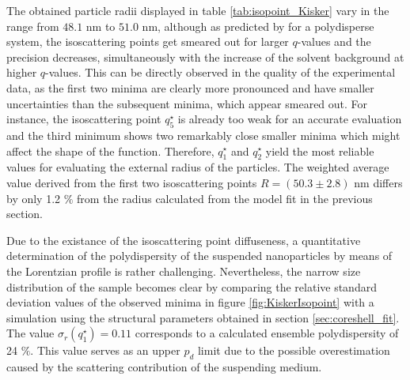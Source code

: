 The obtained particle radii displayed in table \ref{tab:isopoint_Kisker} vary in the range from \(48.1\) nm to \(51.0\) nm, although as predicted by \cite{kawaguchi_isoscattering_1992} for a polydisperse system, the isoscattering points get smeared out for larger \( q \)-values and the precision decreases, simultaneously with the increase of the solvent background at higher \(q\)-values. This can be directly observed in the quality of the experimental data, as the first two minima are clearly more pronounced and have smaller uncertainties than the subsequent minima, which appear smeared out. For instance, the isoscattering point \(q^{\star}_5\) is already too weak for an accurate evaluation and the third minimum shows two remarkably close smaller minima which might affect the shape of the function. Therefore, \(q^{\star}_1\) and \(q^{\star}_2\) yield the most reliable values for evaluating the external radius of the particles. The weighted average value derived from the first two isoscattering points \(R=\left(50.3\pm2.8 \right)\) nm differs by only 1.2 $\%$ from the radius calculated from the model fit in the previous section.
 
Due to the existance of the isoscattering point diffuseness, a quantitative determination of the polydispersity of the suspended nanoparticles by means of the Lorentzian profile is rather challenging. Nevertheless, the narrow size distribution of the sample becomes clear by comparing the relative standard deviation values of the observed minima in figure \ref{fig:KiskerIsopoint} with a simulation using the structural parameters obtained in section \ref{sec:coreshell_fit}. The value \( \sigma_r(q^{\star}_1)=0.11 \) corresponds to a calculated ensemble polydispersity of 24 $\%$. This value serves as an upper \( p_d \) limit due to the possible overestimation caused by the scattering contribution of the suspending medium.


